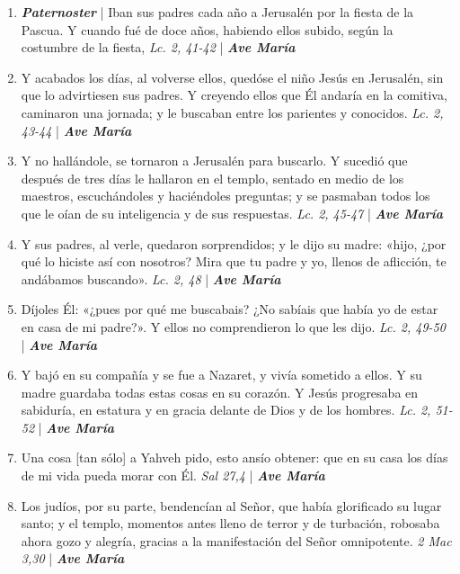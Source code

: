 \documentclass[../../devocionario.tex]{subfiles}
\begin{document}
    \begin{enumerate}
        \item \textbf{\textit{Paternoster}} | Iban sus padres cada año a Jerusalén por la fiesta de la Pascua. 
            Y cuando fué de doce años, habiendo ellos subido, según la costumbre de la fiesta, \textit{Lc. 2, 41-42} | \textbf{\textit{Ave María}}

        \item Y acabados los días, al volverse ellos, quedóse el niño Jesús en Jerusalén, sin que lo advirtiesen sus padres. 
            Y creyendo ellos que Él andaría en la comitiva, caminaron una jornada; 
            y le buscaban entre los parientes y conocidos. \textit{Lc. 2, 43-44} | \textbf{\textit{Ave María}}

        \item Y no hallándole, se tornaron a Jerusalén para buscarlo. Y sucedió que después de tres días le hallaron en el templo, 
            sentado en medio de los maestros, escuchándoles y haciéndoles preguntas; 
            y se pasmaban todos los que le oían de su inteligencia y de sus respuestas. \textit{Lc. 2, 45-47} | \textbf{\textit{Ave María}}

        \item Y sus padres, al verle, quedaron sorprendidos; y le dijo su madre: «hijo, ¿por qué lo hiciste así con nosotros? 
            Mira que tu padre y yo, llenos de aflicción, te andábamos buscando». \textit{Lc. 2, 48} | \textbf{\textit{Ave María}}

        \item Díjoles Él: «¿pues por qué me buscabais? ¿No sabíais que había yo de estar en casa de mi padre?». 
            Y ellos no comprendieron lo que les dijo. \textit{Lc. 2, 49-50} | \textbf{\textit{Ave María}}

        \item Y bajó en su compañía y se fue a Nazaret, y vivía sometido a ellos. Y su madre guardaba todas estas cosas en su corazón. 
            Y Jesús progresaba en sabiduría, en estatura y en gracia delante de Dios y de los hombres. \textit{Lc. 2, 51-52} | \textbf{\textit{Ave María}}

        \item Una cosa [tan sólo] a Yahveh pido, esto ansío obtener: que en su casa los días de mi vida pueda morar con Él. \textit{Sal 27,4} | \textbf{\textit{Ave María}}

        \item Los judíos, por su parte, bendencían al Señor, que había glorificado su lugar santo; y el templo, momentos antes lleno de terror y de turbación, 
            robosaba ahora gozo y alegría, gracias a la manifestación del Señor omnipotente. \textit{2 Mac 3,30} | \textbf{\textit{Ave María}}


\end{enumerate}
\end{document}
